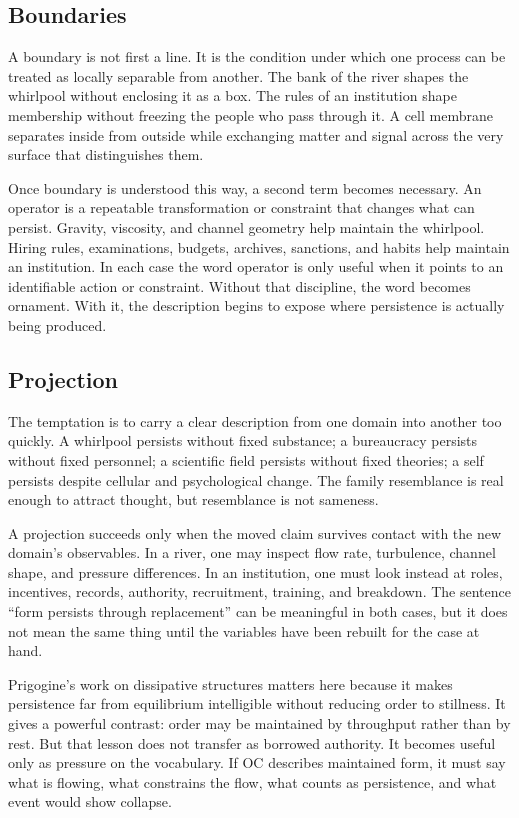 \documentclass[11pt,a4paper,openany]{book}
\begin{document}
\subsection{Boundaries}
A boundary is not first a line. It is the condition under which one process can be treated as locally separable from another. The bank of the river shapes the whirlpool without enclosing it as a box. The rules of an institution shape membership without freezing the people who pass through it. A cell membrane separates inside from outside while exchanging matter and signal across the very surface that distinguishes them. \cite{landau_stat_physics,prigogine_dissipative}\par
Once boundary is understood this way, a second term becomes necessary. An operator is a repeatable transformation or constraint that changes what can persist. Gravity, viscosity, and channel geometry help maintain the whirlpool. Hiring rules, examinations, budgets, archives, sanctions, and habits help maintain an institution. In each case the word operator is only useful when it points to an identifiable action or constraint. Without that discipline, the word becomes ornament. With it, the description begins to expose where persistence is actually being produced.\par
\subsection{Projection}
The temptation is to carry a clear description from one domain into another too quickly. A whirlpool persists without fixed substance; a bureaucracy persists without fixed personnel; a scientific field persists without fixed theories; a self persists despite cellular and psychological change. The family resemblance is real enough to attract thought, but resemblance is not sameness. \cite{landau_stat_physics,prigogine_dissipative}\par
A projection succeeds only when the moved claim survives contact with the new domain's observables. In a river, one may inspect flow rate, turbulence, channel shape, and pressure differences. In an institution, one must look instead at roles, incentives, records, authority, recruitment, training, and breakdown. The sentence ``form persists through replacement'' can be meaningful in both cases, but it does not mean the same thing until the variables have been rebuilt for the case at hand.\par
Prigogine's work on dissipative structures matters here because it makes persistence far from equilibrium intelligible without reducing order to stillness. It gives a powerful contrast: order may be maintained by throughput rather than by rest. But that lesson does not transfer as borrowed authority. It becomes useful only as pressure on the vocabulary. If OC describes maintained form, it must say what is flowing, what constrains the flow, what counts as persistence, and what event would show collapse.\par
\end{document}
